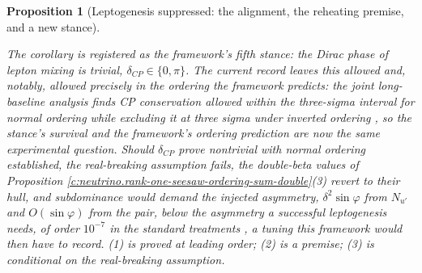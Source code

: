 \documentclass[11pt]{article}
\newtheorem{proposition}[theorem]{Proposition}
\theoremstyle{definition}
\theoremstyle{plain}
\begin{document}
\begin{proposition}[Leptogenesis suppressed: the alignment, the reheating premise, and a new stance]
\begin{enumerate}
\end{enumerate}
The corollary is registered as the framework's fifth stance: the Dirac phase of lepton mixing is trivial, $\delta_{CP} \in \{0, \pi\}$. The current record leaves this allowed and, notably, allowed precisely in the ordering the framework predicts: the joint long-baseline analysis finds CP conservation allowed within the three-sigma interval for \emph{normal} ordering while excluding it at three sigma under \emph{inverted} ordering \cite{T2KNOvA2025}, so the stance's survival and the framework's ordering prediction are now the same experimental question. Should $\delta_{CP}$ prove nontrivial with normal ordering established, the real-breaking assumption fails, the double-beta values of Proposition \ref{c:neutrino.rank-one-seesaw-ordering-sum-double}(3) revert to their hull, and subdominance would demand the injected asymmetry, $\delta^{2}\sin\varphi$ from $N_{u'}$ and $O(\sin\varphi)$ from the pair, below the asymmetry a successful leptogenesis needs, of order $10^{-7}$ in the standard treatments \cite{DavidsonNardiNir2008}, a tuning this framework would then have to record. (1) is proved at leading order; (2) is a premise; (3) is conditional on the real-breaking assumption.
\end{proposition}
\end{document}
